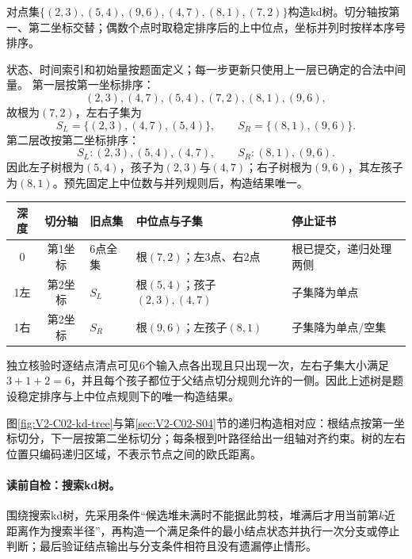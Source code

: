 \begin{example}[六点平衡kd树]\label{exm:V2-C02-kd-build}
对点集$\{(2,3),(5,4),(9,6),(4,7),(8,1),(7,2)\}$构造kd树。切分轴按第一、第二坐标交替；偶数个点时取稳定排序后的上中位点，坐标并列时按样本序号排序。
\end{example}
\begin{solution}
\SolGiven 状态、时间索引和初始量按题面定义；每一步更新只使用上一层已确定的合法中间量。
\SolDerive
第一层按第一坐标排序：
\[
(2,3),(4,7),(5,4),\boxed{(7,2)},(8,1),(9,6),
\]
故根为$(7,2)$，左右子集为
\[
S_L=\{(2,3),(4,7),(5,4)\},
\qquad
S_R=\{(8,1),(9,6)\}.
\]
第二层改按第二坐标排序：
\[
S_L:(2,3),\boxed{(5,4)},(4,7),
\qquad
S_R:(8,1),\boxed{(9,6)}.
\]
因此左子树根为$(5,4)$，孩子为$(2,3)$与$(4,7)$；右子树根为$(9,6)$，其左孩子为$(8,1)$。预先固定上中位数与并列规则后，构造结果唯一。
\begin{center}
\begin{tabularx}{\linewidth}{@{}c c X X X@{}}
\toprule
深度 & 切分轴 & 旧点集 & 中位点与子集 & 停止证书\\
\midrule
0 & 第1坐标 & 6点全集 & 根$(7,2)$；左3点、右2点 & 根已提交，递归处理两侧\\
1左 & 第2坐标 & $S_L$ & 根$(5,4)$；孩子$(2,3),(4,7)$ & 子集降为单点\\
1右 & 第2坐标 & $S_R$ & 根$(9,6)$；左孩子$(8,1)$ & 子集降为单点/空集\\
\bottomrule
\end{tabularx}
\end{center}
独立核验时逐结点清点可见6个输入点各出现且只出现一次，左右子集大小满足$3+1+2=6$，并且每个孩子都位于父结点切分规则允许的一侧。因此上述树是题设稳定排序与上中位点规则下的唯一构造结果。
\end{solution}


图\ref{fig:V2-C02-kd-tree}与第\ref{sec:V2-C02-S04}节的递归构造相对应：根结点按第一坐标切分，下一层按第二坐标切分；每条根到叶路径给出一组轴对齐约束。树的左右位置只编码递归区域，不表示节点之间的欧氏距离。


\paragraph{读前自检：搜索kd树。}围绕搜索kd树，先采用条件“候选堆未满时不能据此剪枝，堆满后才用当前第$k$近距离作为搜索半径”，再构造一个满足条件的最小结点状态并执行一次分支或停止判断；最后验证结点输出与分支条件相符且没有遗漏停止情形。\par

